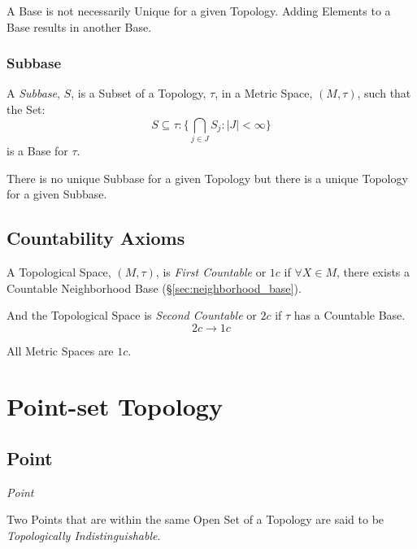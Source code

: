 A Base is not necessarily Unique for a given Topology. Adding Elements
to a Base results in another Base.



\subsubsection{Subbase}

A \emph{Subbase}, $S$, is a Subset of a Topology, $\tau$, in a Metric
Space, $(M,\tau)$, such that the Set:
\[
    S \subseteq \tau : \{ \bigcap_{j \in J} S_j : |J| < \infty \}
\]
is a Base for $\tau$.

There is no unique Subbase for a given Topology but there is a unique
Topology for a given Subbase.



\subsection{Countability Axioms}\label{sec:countability_axioms}

A Topological Space, $(M,\tau)$, is \emph{First Countable} or $1c$ if
$\forall X \in M$, there exists a Countable Neighborhood Base
(\S\ref{sec:neighborhood_base}).

And the Topological Space is \emph{Second Countable} or $2c$ if $\tau$
has a Countable Base.
\[
    2c \rightarrow 1c
\]

All Metric Spaces are $1c$.



\section{Point-set Topology}\label{sec:point_set}

\subsection{Point}\label{sec:topological_point}

\emph{Point}

Two Points that are within the same Open Set of a Topology are said to
be \emph{Topologically Indistinguishable}.



